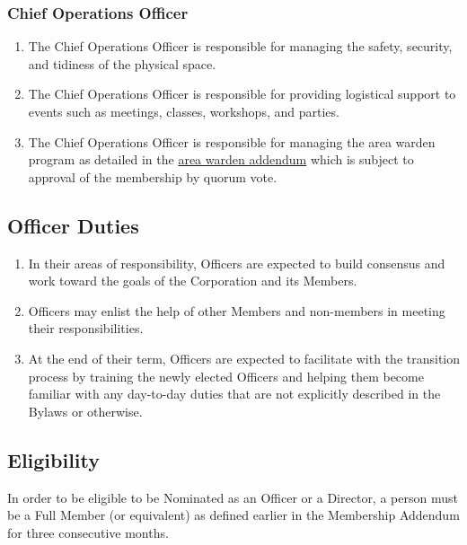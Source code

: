 \documentclass{article}
\begin{document}
\subsubsection{Chief Operations Officer}
\begin{enumerate}
\item The Chief Operations Officer is responsible for managing the safety, security, and 
tidiness of the physical space.
\item The Chief Operations Officer is responsible for providing logistical support to events 
such as meetings, classes, workshops, and parties.
\item The Chief Operations Officer is responsible for managing the area warden program as
  detailed in the \href{https://github.com/Hive13/bylaws-and-membership-addendum/raw/master/warden-addendum.pdf}{area warden addendum} which is subject to approval of the membership by
quorum vote.
\end{enumerate}
\subsection{Officer Duties}
\begin{enumerate}
\item In their areas of responsibility, Officers are expected to build consensus and work 
toward the goals of the Corporation and its Members.
\item Officers may enlist the help of other Members and non-members in meeting their 
responsibilities.
\item At the end of their term, Officers are expected to facilitate with the transition 
process by training the newly elected Officers and helping them become familiar with any 
day-to-day duties that are not explicitly described in the Bylaws or otherwise.
\end{enumerate}
\subsection{Eligibility}
In order to be eligible to be Nominated as an Officer or a Director, a person must 
be a Full Member (or equivalent) as defined earlier in the Membership Addendum for three 
consecutive months.
\end{document}

